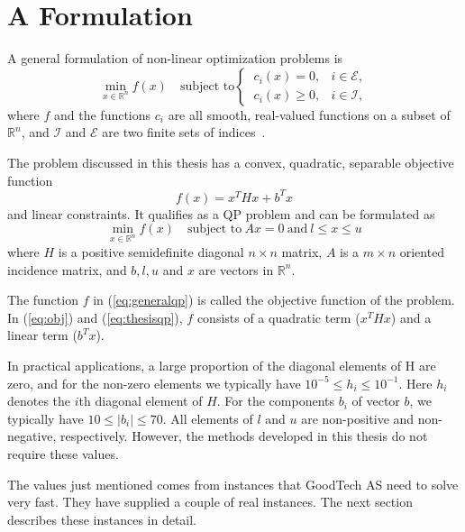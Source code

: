 \section{A Formulation}
\label{sec:problem}
A general formulation of non-linear optimization problems is
\begin{equation}
    \label{eq:generalqp}
    \min_{x \in \mathbb{R}^n} f(x) \quad \textrm{subject to}
    \begin{cases}
        ~c_i(x) = 0,   & i \in \mathcal{E}, \\
        ~c_i(x) \ge 0, & i \in \mathcal{I},
    \end{cases}
\end{equation}
where $f$ and the functions $c_i$ are all smooth, real-valued functions on a
subset of $\mathbb{R}^n$, and $\mathcal{I}$ and $\mathcal{E}$ are two finite
sets of indices~\cite{nocedal}.

The problem discussed in this thesis has a convex, quadratic, separable
objective function
\begin{equation}
    \label{eq:obj}
    f(x) = x^T H x + b^T x
\end{equation}
and linear constraints. It qualifies as a QP problem and can be formulated as
\begin{equation}
    \label{eq:thesisqp}
    \min_{x \in \mathbb{R}^n} f(x)
    \quad \textrm{subject to}
    ~
    Ax = 0
    ~
    \textrm{and}
    ~
    l \le x \le u
\end{equation}
where $H$ is a positive semidefinite diagonal $n \times n$ matrix, $A$ is a
$m \times n$ oriented incidence matrix, and $b, l, u$ and $x$ are vectors in
$\mathbb{R}^n$.

The function $f$ in (\ref{eq:generalqp}) is called the objective function of
the problem. In (\ref{eq:obj}) and (\ref{eq:thesisqp}), $f$ consists of a
quadratic term ($x^T H x$) and a linear term ($b^T x$).

In practical applications, a large proportion of the diagonal elements of H are
zero, and for the non-zero elements we typically have
$10^{-5} \le h_i \le 10^{-1}$. Here $h_i$ denotes the $i$th diagonal element of
$H$. For the components $b_i$ of vector $b$, we typically have
$10 \le |b_i| \le 70$. All elements of $l$ and $u$ are non-positive 
and non-negative, respectively. However, the methods developed in this thesis
do not require these values.

The values just mentioned comes from instances that GoodTech AS need to solve
very fast.
They have supplied a couple of real instances.
The next section describes these instances in detail.
